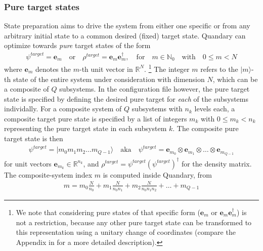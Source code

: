 \documentclass[11pt]{article}
\newcommand{\R}{\mathds{R}}
\newcommand{\N}{\mathds{N}}
\begin{document}
\subsubsection{Pure target states}\label{sec:statepreparation}
State preparation aims to drive the system from either one specific or from any arbitrary initial state to a common desired (fixed) target state. Quandary can optimize towards \textit{pure} target states of the form 
\begin{align}
 \psi^{target} = \boldsymbol{e}_m \quad \text{or} \quad \rho^{target} = \boldsymbol{e}_m \boldsymbol{e}_m^\dagger, \quad \text{for}\quad m\in \N_0\quad \text{with}\quad 0\leq m < N
\end{align}
where $\boldsymbol{e}_m$ denotes the $m$-th unit vector in $\R^N$. 
\footnote{We note that considering pure states of that specific form ($\boldsymbol{e}_m$ or $\boldsymbol{e}_m\boldsymbol{e}_m^\dagger$) is not a restriction, because any other pure target state can be transformed to this representation using a unitary change of coordinates (compare the Appendix in \cite{guenther2021quantum} for a more detailed description).}
The integer $m$ refers to the $|m\rangle$-th state of the entire system under consideration with dimension $N$, which can be a composite of $Q$ subsystems. 
In the configuration file however, the pure target state is specified by defining the desired pure target for \textit{each} of the subsystems individally. For a composite system of $Q$ subsystems with $n_k$ levels each, a composite target pure state is specified by a list of integers $m_k$ with $0\leq m_k < n_k$ representing the pure target state in each subsystem $k$. The composite pure target state is then
\begin{align}
  \psi^{target} = |m_0 m_1 m_2 \dots m_{Q-1} \rangle \quad \text{aka} \quad  \psi^{target} = \boldsymbol{e}_{m_0}\otimes  \boldsymbol{e}_{m_1}\otimes  \dots \otimes\boldsymbol{e}_{m_{Q-1}} 
\end{align}
for unit vectors $\boldsymbol{e}_{m_k} \in \R^{n_k}$, and $\rho^{target} = \psi^{target} (\psi^{target})^\dagger$ for the density matrix. The composite-system index $m$ is computed inside Quandary, from 
\begin{align}
  m = m_0 \frac{N}{n_0} + m_1 \frac{N}{n_0n_1} + m_2 \frac{N}{n_0n_1n_2} + \dots + m_{Q-1}
\end{align}
\end{document}
